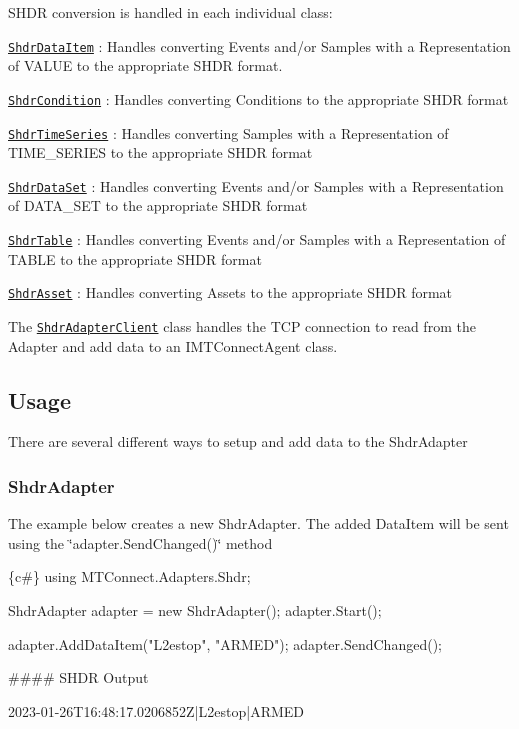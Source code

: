 S\+H\+DR conversion is handled in each individual class\+:
\begin{DoxyItemize}
\item \href{Shdr/ShdrDataItem.cs}{\tt Shdr\+Data\+Item} \+: Handles converting Events and/or Samples with a Representation of V\+A\+L\+UE to the appropriate S\+H\+DR format.
\item \href{Shdr/ShdrCondition.cs}{\tt Shdr\+Condition} \+: Handles converting Conditions to the appropriate S\+H\+DR format
\item \href{Shdr/ShdrTimeSeries.cs}{\tt Shdr\+Time\+Series} \+: Handles converting Samples with a Representation of T\+I\+M\+E\+\_\+\+S\+E\+R\+I\+ES to the appropriate S\+H\+DR format
\item \href{Shdr/ShdrDataSet.cs}{\tt Shdr\+Data\+Set} \+: Handles converting Events and/or Samples with a Representation of D\+A\+T\+A\+\_\+\+S\+ET to the appropriate S\+H\+DR format
\item \href{Shdr/ShdrTable.cs}{\tt Shdr\+Table} \+: Handles converting Events and/or Samples with a Representation of T\+A\+B\+LE to the appropriate S\+H\+DR format
\item \href{Shdr/ShdrAsset.cs}{\tt Shdr\+Asset} \+: Handles converting Assets to the appropriate S\+H\+DR format
\end{DoxyItemize}

The \href{Adapters/Shdr/ShdrAdapterClient.cs}{\tt Shdr\+Adapter\+Client} class handles the T\+CP connection to read from the Adapter and add data to an I\+M\+T\+Connect\+Agent class.

\subsection*{Usage}

There are several different ways to setup and add data to the Shdr\+Adapter

\subsubsection*{Shdr\+Adapter}

The example below creates a new Shdr\+Adapter. The added Data\+Item will be sent using the \char`\"{}adapter.\+Send\+Changed()\char`\"{} method 
\begin{DoxyCode}
\{c#\}
using MTConnect.Adapters.Shdr;

ShdrAdapter adapter = new ShdrAdapter();
adapter.Start();

adapter.AddDataItem("L2estop", "ARMED");
adapter.SendChanged();
\end{DoxyCode}
 \#\#\#\# S\+H\+DR Output 
\begin{DoxyCode}
2023-01-26T16:48:17.0206852Z|L2estop|ARMED
\end{DoxyCode}


